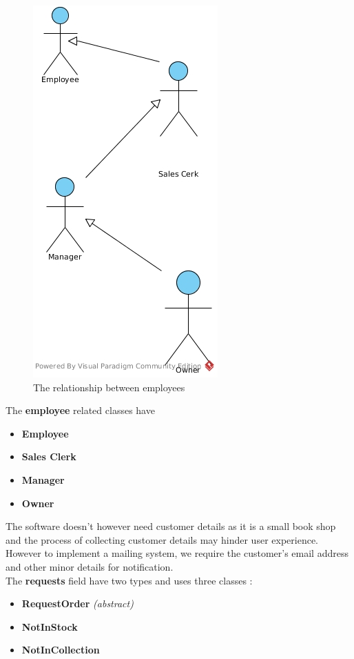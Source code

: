 \documentclass{scrreprt}
\begin{document}
\begin{figure}
\includegraphics{Actors.jpg}
\caption{The relationship between employees}
\end{figure} 

\clearpage
The \textbf{employee} related classes have 
\begin{itemize}
\item \textbf{Employee}
\item \textbf{Sales Clerk}
\item \textbf{Manager}
\item \textbf{Owner}
\end{itemize} 

The software doesn't however need customer details as it is a small book shop and the process of collecting customer details may hinder user experience. However to implement a mailing system, we require the customer's email address and other minor details for notification. \\

The \textbf{requests} field have two types and uses three classes :
\begin{itemize}
\item \textbf{RequestOrder} \emph{(abstract)}
\item \textbf{NotInStock} 
\item \textbf{NotInCollection}
\end{itemize} 
\end{document}
